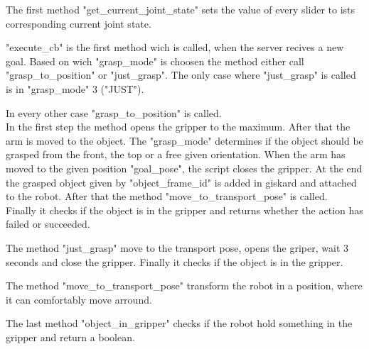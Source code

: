 \documentclass[main.tex]{subfiles}
\begin{document}
			 \vspace{0,75 cm}
			 The first method "get\_current\_joint\_state"  sets the value of every slider to ists corresponding current joint state.
			 
			 \vspace{0,25 cm}
			 "execute\_cb" is the first method wich is called, when the server recives a new goal. Based on wich "grasp\_mode" is choosen the method either call "grasp\_to\_position" or "just\_grasp". The only case where "just\_grasp" is called is in "grasp\_mode" 3 ("JUST").
			 
			 \vspace{0,25 cm}
			 In every other case "grasp\_to\_position" is called.\\
			In the first step the method opens the gripper to the maximum. After that the arm is moved to the object. The "grasp\_mode" determines if the object should be grasped from the front, the top or a free given orientation. When the arm has moved to the given position "goal\_pose", the script closes the gripper. At the end the grasped object given by "object\_frame\_id" is added in giskard and attached to the robot. After that the method "move\_to\_transport\_pose" is called.\\
			Finally it checks if the object is in the gripper and returns whether the action has failed or succeeded.
			
			\vspace{0,25 cm}
			The method "just\_grasp" move to the transport pose, opens the griper, wait 3 seconds and close the gripper. Finally it checks if the object is in the gripper.
			
			\vspace{0,25 cm}
			The method "move\_to\_transport\_pose" transform the robot in a position, where it can comfortably move arround.
			
			\vspace{0,25 cm}
			The last method "object\_in\_gripper" checks if the robot hold something in the gripper and return a boolean.
			 


			
	\endgroup
\end{document}
